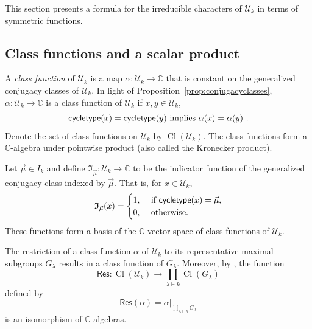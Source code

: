 \documentclass[ALCO,Unicode]{cedram}
\newcommand{\defncolor}{\color{darkred}}
\newcommand{\defn}[1]{{\defncolor\emph{#1}}} %
\newcommand{\CC}{\mathbb C}
\newcommand{\ind}{\mathfrak{I}}
\newcommand{\class}{\operatorname{Cl}}
\begin{document}
This section presents a formula for the irreducible characters of $\mathcal{U}_k$ in terms of symmetric functions.

\subsection{Class functions and a scalar product} \label{subsec:classfunctions}

A \defn{class function} of $\mathcal{U}_k$ is a map $\alpha: \mathcal{U}_k \to
\CC$ that is constant on the generalized conjugacy classes of $\mathcal{U}_k$.
In light of Proposition~\ref{prop:conjugacyclasses},
$\alpha: \mathcal{U}_k \to \CC$ is a class function of $\mathcal{U}_k$ if
$x, y \in \mathcal{U}_k$,
$$\mathsf{cycletype}(x) = \mathsf{cycletype}(y)\hbox{ implies }\alpha(x) = \alpha(y)~.$$
Denote the set of class functions on $\mathcal{U}_k$ by
$\class({\mathcal{U}_k})$.  The class functions form a $\CC$-algebra
under pointwise product (also called the Kronecker product).

Let $\vec{\mu} \in I_k$ and define
$\ind_{\vec{\mu}} : \mathcal{U}_k \rightarrow \CC$ to be the
indicator function of the generalized conjugacy class indexed by
$\vec{\mu}$.  That is, for $x \in \mathcal{U}_k$,
\begin{equation}\label{eq:indicator}
    \ind_{\vec{\mu}}(x) = \begin{cases}1,&\hbox{ if }\mathsf{cycletype}(x)=\vec{\mu},\\
    0,&\hbox{ otherwise.}\end{cases}
\end{equation}
These functions form a
basis of the $\CC$-vector space of class functions of $\mathcal{U}_k$.

The restriction of a class function $\alpha$ of $\mathcal{U}_k$ to its
representative maximal subgroups $G_\lambda$ results in a class function of
$G_\lambda$. Moreover, by \cite[Proposition 7.5 and Proposition 7.6]{Steinberg.2016},
the function
\begin{equation}\label{restrictionmap}
    \mathsf{Res} \colon \class(\mathcal{U}_k) \longrightarrow \prod_{\lambda \vdash k} \class(G_{\lambda})
\end{equation}
defined by
$$\mathsf{Res}(\alpha) = \alpha|_{\prod_{\lambda \vdash k} G_{\lambda}}$$
is an isomorphism of $\CC$-algebras.
\end{document}
